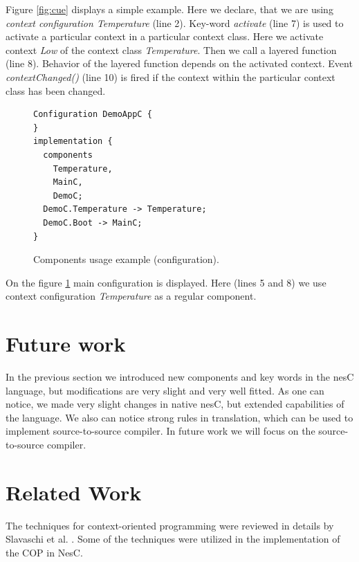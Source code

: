 \documentclass{ubicomp-ext}
\begin{document}
Figure \ref{fig:cue} displays a simple example. Here we declare, that we are using \textit{context configuration Temperature} (line 2). Key-word \textit{activate} (line 7) is used to activate a particular context in a particular context class. Here we activate context \textit{Low} of the context class \textit{Temperature}. Then we call a layered function (line 8). Behavior of the layered function depends on the activated context. Event \textit{contextChanged()} (line 10) is fired if the context within the particular context class has been changed.

\begin{figure}
\begin{lstlisting}
Configuration DemoAppC {
}
implementation {
  components
    Temperature,
    MainC,
    DemoC;
  DemoC.Temperature -> Temperature;
  DemoC.Boot -> MainC;
}
\end{lstlisting}
\caption{Components usage example (configuration).}
\label{fig:cuec}
\end{figure}

On the figure \ref{fig:cuec} main configuration is displayed. Here (lines 5 and 8) we use context configuration \textit{Temperature} as a regular component.

\section{Future work}
In the previous section we introduced new components and key words in the nesC language, but modifications are very slight and very well fitted. As one can notice, we made very slight changes in native nesC, but extended capabilities of the language. We also can notice strong rules in translation, which can be used to implement source-to-source compiler. In future work we will focus on the source-to-source compiler.

\section{Related Work}
The techniques for context-oriented programming were reviewed in details by Slavaschi et al. \cite{salvaneschi12}. Some of the techniques were utilized in the implementation of the COP in NesC.
\end{document}
